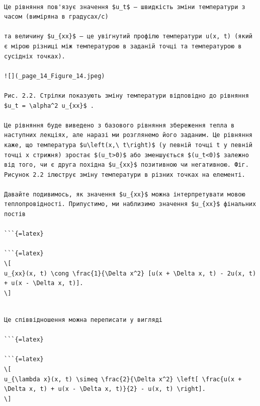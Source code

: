 \documentclass[
]{article}
\begin{document}
\begin{verbatim}

Це рівняння пов'язує значення $u_t$ — швидкість зміни температури з часом (виміряна в градусах/с)

та величину $u_{xx}$ — це увігнутий профілю температури u(x, t) (який є мірою різниці між температурою в заданій точці та температурою в сусідніх точках).

![](_page_14_Figure_14.jpeg)

Рис. 2.2. Стрілки показують зміну температури відповідно до рівняння $u_t = \alpha^2 u_{xx}$ .

Це рівняння буде виведено з базового рівняння збереження тепла в наступних лекціях, але наразі ми розглянемо його заданим. Це рівняння каже, що температура $u\left(x,\ t\right)$ (у певній точці t у певній точці x стрижня) зростає $(u_t>0)$ або зменшується $(u_t<0)$ залежно від того, чи є друга похідна $u_{xx}$ позитивною чи негативною. Фіг. Рисунок 2.2 ілюструє зміну температури в різних точках на елементі.

Давайте подивимось, як значення $u_{xx}$ можна інтерпретувати мовою теплопровідності. Припустимо, ми наблизимо значення $u_{xx}$ фінальних постів

```{=latex}

```{=latex}
\[
u_{xx}(x, t) \cong \frac{1}{\Delta x^2} [u(x + \Delta x, t) - 2u(x, t) + u(x - \Delta x, t)].
\]
\end{verbatim}

\begin{verbatim}

Це співвідношення можна переписати у вигляді

```{=latex}

```{=latex}
\[
u_{\lambda x}(x, t) \simeq \frac{2}{\Delta x^2} \left[ \frac{u(x + \Delta x, t) + u(x - \Delta x, t)}{2} - u(x, t) \right].
\]
\end{verbatim}
\end{document}
